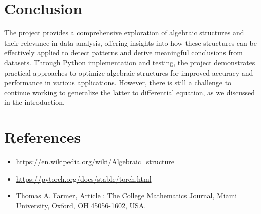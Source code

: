 \documentclass{report}
\begin{document}
\section{Conclusion}
    The project provides a comprehensive 
    exploration of algebraic structures and
    their relevance in data analysis, 
    offering insights into how these 
    structures can be effectively applied 
    to detect patterns and derive meaningful
    conclusions from datasets. Through Python 
    implementation and testing, the project 
    demonstrates practical approaches to 
    optimize algebraic structures for 
    improved accuracy and performance 
    in various applications. However, there is still a 
    challenge to continue working to generalize the latter to 
    differential equation, as we discussed in the introduction.



    \section{References}

        \begin{itemize}
            \item \url{https://en.wikipedia.org/wiki/Algebraic_structure}
            \item \url{https://pytorch.org/docs/stable/torch.html}
            \item Thomas A. Farmer, Article : The College Mathematics Journal, Miami University, Oxford, OH 45056-1602, USA. 
        \end{itemize}


    
\end{document}
